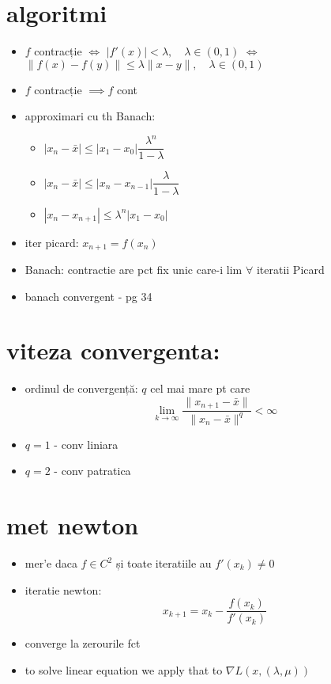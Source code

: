 \documentclass[11pt]{article}
\begin{document}
\section*{algoritmi}
\label{sec:orge94672a}
\begin{itemize}
\item \(f\) contracție \(\iff\)  \(|f'(x)| < \lambda,\quad \lambda \in (0, 1)\) \(\iff\)
\(\| f(x) - f(y) \| \leq \lambda \| x - y\|, \quad \lambda \in (0, 1)\)
\item \(f\) contracție \(\implies f\) cont
\item approximari cu th Banach:
\begin{itemize}
\item \(| x_n - \bar{x}| \leq | x_1 - x_0 | \dfrac{\lambda^n}{1-\lambda}\)
\item \(| x_n - \bar{x}| \leq | x_n - x_{n-1} | \dfrac{\lambda}{1-\lambda}\)
\item \(| x_n - x_{n+1}| \leq \lambda^n | x_1 - x_0 |\)
\end{itemize}
\item iter picard: \(x_{n+1} = f(x_n)\)
\item Banach: contractie are pct fix unic care-i lim \(\forall\) iteratii Picard
\item banach convergent - pg 34
\end{itemize}
\section*{viteza convergenta:}
\label{sec:org9c47415}
\begin{itemize}
\item ordinul de convergență: \(q\) cel mai mare pt care 
  \[
\lim\limits_{k\to \infty} \frac{\|x_{n+1} - \bar{x}\|}{\|x_{n} - \bar{x}\|^q} < \infty
  \]
\item \(q=1\) - conv liniara
\item \(q=2\) - conv patratica
\end{itemize}
\section*{met newton}
\label{sec:orga69652e}
\begin{itemize}
\item mer'e daca \(f \in C^2\) și toate iteratiile au \(f'(x_k) \ne 0\)
\item iteratie newton:
\[ x_{k+1} = x_k - \frac{f(x_k)}{f'(x_k)} \]
\item converge la zerourile fct
\item to solve linear equation we apply that to \(\nabla L(x, (\lambda, \mu))\)
\end{itemize}
\end{document}
